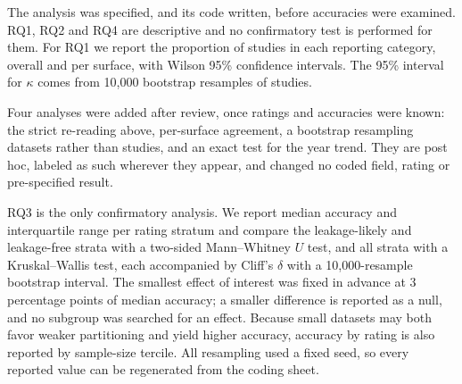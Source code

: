 The analysis was specified, and its code written, before accuracies were examined. RQ1, RQ2 and RQ4 are descriptive and no confirmatory test is performed for them. For RQ1 we report the proportion of studies in each reporting category, overall and per surface, with Wilson 95\% confidence intervals. The 95\% interval for $\kappa$ comes from 10{,}000 bootstrap resamples of studies.

Four analyses were added after review, once ratings and accuracies were known: the strict re-reading above, per-surface agreement, a bootstrap resampling datasets rather than studies, and an exact test for the year trend. They are post hoc, labeled as such wherever they appear, and changed no coded field, rating or pre-specified result.

RQ3 is the only confirmatory analysis. We report median accuracy and interquartile range per rating stratum and compare the leakage-likely and leakage-free strata with a two-sided Mann--Whitney $U$ test, and all strata with a Kruskal--Wallis test, each accompanied by Cliff's $\delta$ with a 10{,}000-resample bootstrap interval. The smallest effect of interest was fixed in advance at 3 percentage points of median accuracy; a smaller difference is reported as a null, and no subgroup was searched for an effect. Because small datasets may both favor weaker partitioning and yield higher accuracy, accuracy by rating is also reported by sample-size tercile. All resampling used a fixed seed, so every reported value can be regenerated from the coding sheet.
